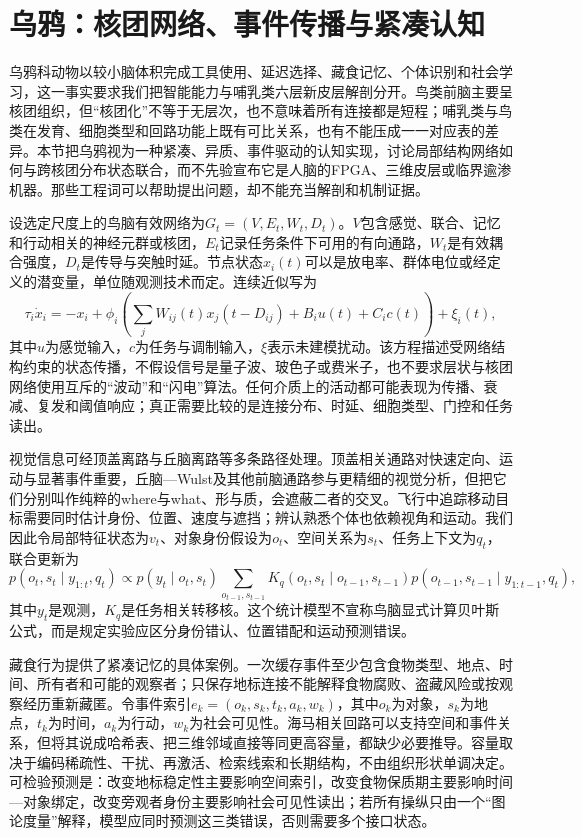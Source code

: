\section{乌鸦：核团网络、事件传播与紧凑认知}
\label{sec:section_8427}

乌鸦科动物以较小脑体积完成工具使用、延迟选择、藏食记忆、个体识别和社会学习，这一事实要求我们把智能能力与哺乳类六层新皮层解剖分开。鸟类前脑主要呈核团组织，但“核团化”不等于无层次，也不意味着所有连接都是短程；哺乳类与鸟类在发育、细胞类型和回路功能上既有可比关系，也有不能压成一一对应表的差异。本节把乌鸦视为一种紧凑、异质、事件驱动的认知实现，讨论局部结构网络如何与跨核团分布状态联合，而不先验宣布它是人脑的FPGA、三维皮层或临界逾渗机器。那些工程词可以帮助提出问题，却不能充当解剖和机制证据。

设选定尺度上的鸟脑有效网络为$G_t=(V,E_t,W_t,D_t)$。$V$包含感觉、联合、记忆和行动相关的神经元群或核团，$E_t$记录任务条件下可用的有向通路，$W_t$是有效耦合强度，$D_t$是传导与突触时延。节点状态$x_i(t)$可以是放电率、群体电位或经定义的潜变量，单位随观测技术而定。连续近似写为
\begin{equation}
 \tau_i\dot x_i=-x_i+\phi_i\!\left(\sum_j W_{ij}(t)x_j(t-D_{ij})+B_i u(t)+C_i c(t)\right)+\xi_i(t),
\end{equation}
其中$u$为感觉输入，$c$为任务与调制输入，$\xi$表示未建模扰动。该方程描述受网络结构约束的状态传播，不假设信号是量子波、玻色子或费米子，也不要求层状与核团网络使用互斥的“波动”和“闪电”算法。任何介质上的活动都可能表现为传播、衰减、复发和阈值响应；真正需要比较的是连接分布、时延、细胞类型、门控和任务读出。

视觉信息可经顶盖离路与丘脑离路等多条路径处理。顶盖相关通路对快速定向、运动与显著事件重要，丘脑—Wulst及其他前脑通路参与更精细的视觉分析，但把它们分别叫作纯粹的where与what、形与质，会遮蔽二者的交叉。飞行中追踪移动目标需要同时估计身份、位置、速度与遮挡；辨认熟悉个体也依赖视角和运动。我们因此令局部特征状态为$v_t$、对象身份假设为$o_t$、空间关系为$s_t$、任务上下文为$q_t$，联合更新为
\begin{equation}
 p(o_t,s_t\mid y_{1:t},q_t)\propto p(y_t\mid o_t,s_t)\sum_{o_{t-1},s_{t-1}}K_q(o_t,s_t\mid o_{t-1},s_{t-1})p(o_{t-1},s_{t-1}\mid y_{1:t-1},q_t),
\end{equation}
其中$y_t$是观测，$K_q$是任务相关转移核。这个统计模型不宣称鸟脑显式计算贝叶斯公式，而是规定实验应区分身份错认、位置错配和运动预测错误。

藏食行为提供了紧凑记忆的具体案例。一次缓存事件至少包含食物类型、地点、时间、所有者和可能的观察者；只保存地标连接不能解释食物腐败、盗藏风险或按观察经历重新藏匿。令事件索引$e_k=(o_k,s_k,t_k,a_k,w_k)$，其中$o_k$为对象，$s_k$为地点，$t_k$为时间，$a_k$为行动，$w_k$为社会可见性。海马相关回路可以支持空间和事件关系，但将其说成哈希表、把三维邻域直接等同更高容量，都缺少必要推导。容量取决于编码稀疏性、干扰、再激活、检索线索和长期结构，不由组织形状单调决定。可检验预测是：改变地标稳定性主要影响空间索引，改变食物保质期主要影响时间—对象绑定，改变旁观者身份主要影响社会可见性读出；若所有操纵只由一个“图论度量”解释，模型应同时预测这三类错误，否则需要多个接口状态。

